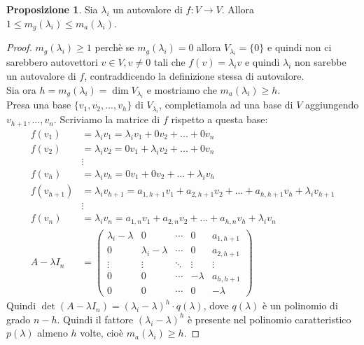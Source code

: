 \documentclass[a4paper]{article}
\theoremstyle{definition}
\newtheorem*{prop}{Proposizione}
\begin{document}
	\begin{prop}
		Sia $\lambda_i$ un autovalore di $f: V \to V$. Allora $1 \le m_g(\lambda_i) \le m_a(\lambda_i)$.
	\end{prop}
	\begin{proof}
		$m_g(\lambda_i) \ge 1$ perchè se $m_g(\lambda_i) = 0$ allora $V_{\lambda_i} = \{0\}$
		e quindi non ci sarebbero autovettori $v \in V, v \ne 0$ tali che $f(v) = \lambda_i v$ e quindi $\lambda_i$ non sarebbe un autovalore di $f$, contraddicendo la definizione stessa di autovalore. \\
		Sia ora $h = m_g(\lambda_i) = \dim V_{\lambda_i}$ e mostriamo che $m_a(\lambda_i) \ge h$. \\
		Presa una base $\{v_1, v_2, ..., v_h\}$ di $V_{\lambda_i}$, completiamola ad una base di $V$ aggiungendo $v_{h+1}, ..., v_n$.
		Scriviamo la matrice di $f$ rispetto a questa base:
		\begin{align*}
			f(v_1) &= \lambda_i v_1 = \lambda_i v_1 + 0v_2 + ... + 0v_n \\
			f(v_2) &= \lambda_i v_2 = 0v_1 + \lambda_i v_2 + ... + 0v_n \\
			&\vdots \\
			f(v_h) &= \lambda_i v_h = 0v_1 + 0v_2 + ... + \lambda_i v_h \\
			f(v_{h+1}) &= \lambda_i v_{h+1} = a_{1, h+1}v_1 + a_{2, h+1}v_2 + ... + a_{h, h+1}v_h + \lambda_i v_{h+1} \\
			&\vdots \\
			f(v_n) &= \lambda_i v_n = a_{1, n}v_1 + a_{2, n}v_2 + ... + a_{h, n}v_h + \lambda_i v_n \\
			A - \lambda I_n &= \begin{pmatrix}
				\lambda_i - \lambda & 0 & \cdots & 0 & a_{1, h+1} \\
				0 & \lambda_i - \lambda & \cdots & 0 & a_{2, h+1} \\
				\vdots & \vdots & \ddots & \vdots & \vdots \\
				0 & 0 & \cdots & - \lambda & a_{h, h+1} \\
				0 & 0 & \cdots & 0 & - \lambda
			\end{pmatrix}
		\end{align*}
		Quindi $\det(A - \lambda I_n) = (\lambda_i - \lambda)^h \cdot q(\lambda)$, dove $q(\lambda)$ è un polinomio di grado $n - h$.
		Quindi il fattore $(\lambda_i - \lambda)^h$ è presente nel polinomio caratteristico $p(\lambda)$ almeno $h$ volte, cioè $m_a(\lambda_i) \ge h$.
	\end{proof}
\end{document}
